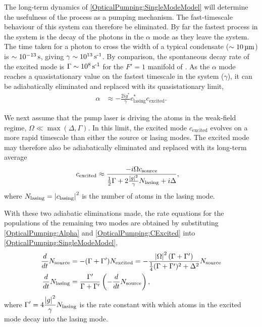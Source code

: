 The long-term dynamics of \eqref{OpticalPumping:SingleModeModel} will determine the usefulness of the process as a pumping mechanism.  The fast-timescale behaviour of this system can therefore be eliminated.  By far the fastest process in the system is the decay of the photons in the $\alpha$ mode as they leave the system.  The time taken for a photon to cross the width of a typical condensate ($\sim\unit[10]{\micro m}$) is $\sim\unit[10^{-13}]{s}$, giving $\gamma \sim \unit[10^{13}]{s\textsuperscript{-1}}$.  By comparison, the spontaneous decay rate of the excited mode is $\Gamma \sim \unit[10^8]{s\textsuperscript{-1}}$ for the $F'=1$ manifold of .  As the $\alpha$ mode reaches a quasistationary value on the fastest timescale in the system ($\gamma$), it can be adiabatically eliminated and replaced with its quasistationary limit,
\begin{align}
    \alpha & \approx -\frac{2 i g^*}{\gamma} c_\text{lasing}^* c_\text{excited}. \label{OpticalPumping:Alpha}
\end{align}

We next assume that the pump laser is driving the atoms in the weak-field regime, $\Omega \ll \max\left(\Delta, \Gamma\right)$.  In this limit, the excited mode $c_\text{excited}$ evolves on a more rapid timescale than either the source or lasing modes.  The excited mode may therefore also be adiabatically eliminated and replaced with its long-term average
\begin{align}
    c_\text{excited} &\approx \frac{-i \Omega c_\text{source}}{\frac{1}{2}\Gamma + 2 \frac{\abs{g}^2}{\gamma} N_\text{lasing} + i \Delta}, \label{OpticalPumping:CExcited}
\end{align}
where $N_\text{lasing} = \left|c_\text{lasing}\right|^2$ is the number of atoms in the lasing mode.

With these two adiabatic eliminations made, the rate equations for the populations of the remaining two modes are obtained by substituting \eqref{OpticalPumping:Alpha} and \eqref{OpticalPumping:CExcited} into \eqref{OpticalPumping:SingleModeModel},
\begin{subequations}
    \label{OpticalPumping:SingleModeRateEquations}
    \begin{align}
        \frac{d}{dt} N_\text{source} &= - (\Gamma + \Gamma') N_\text{excited} =- \frac{\abs{\Omega}^2 \left(\Gamma + \Gamma'\right)}{\frac{1}{4}(\Gamma + \Gamma')^2 + \Delta^2} N_\text{source} \label{OpticalPumping:NSourceDE}\\
        \frac{d}{dt} N_\text{lasing} &= \frac{\Gamma'}{\Gamma + \Gamma'} \left( - \frac{d}{dt} N_\text{source}\right),
    \end{align}
\end{subequations}
where $\displaystyle \Gamma' = 4 \frac{\left|g\right|^2}{\gamma} N_\text{lasing}$ is the rate constant with which atoms in the excited mode decay into the lasing mode.

